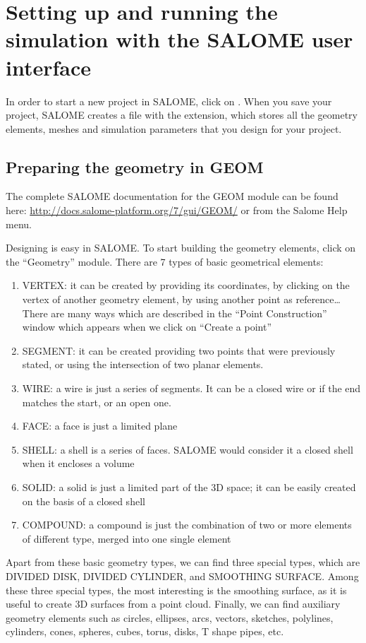 \documentclass{../GPUSPHtemplate}
\begin{document}
\section{Setting up and running the simulation with the SALOME user interface}

In order to start a new project in SALOME, click on . 
When you save your project, SALOME creates a file with the 
 extension, which stores all the geometry elements, 
meshes and simulation parameters that you design for your project.

\subsection{Preparing the geometry in GEOM}

The complete SALOME documentation for the GEOM module can be found here:
\url{http://docs.salome-platform.org/7/gui/GEOM/}
or from the Salome Help menu.

Designing is easy in SALOME. To start building the geometry 
elements, click on the “Geometry” module. 
There are 7 types of basic geometrical elements:
\begin{enumerate}
\item VERTEX: it can be created by providing its coordinates, 
by clicking on the vertex of another geometry element, 
by using another point as reference…There are many ways 
which are described in the “Point Construction” window 
which appears when we click on “Create a point”
\item SEGMENT: it can be created providing two points 
that were previously stated, or using the intersection of 
two planar elements. 
\item WIRE: a wire is just a series of segments. 
It can be a closed wire or if the end matches the start, 
or an open one.
\item FACE: a face is just a limited plane 
\item SHELL: a shell is a series of faces. 
SALOME would consider it a closed shell when it 
encloses a volume
\item SOLID: a solid is just a limited part of the 3D space; 
it can be easily created on the basis of a closed shell
\item COMPOUND: a compound is just the combination 
of two or more elements of different type, merged 
into one single element
\end{enumerate}
Apart from these basic geometry types, we can find 
three special types, which are 
DIVIDED DISK, DIVIDED CYLINDER, and SMOOTHING SURFACE. 
Among these three special types, the most interesting 
is the smoothing surface, as it is useful to create 
3D surfaces from a point cloud.
Finally, we can find auxiliary geometry elements such as 
circles, ellipses, arcs, vectors, sketches, polylines, cylinders, 
cones, spheres, cubes, torus, disks, T shape pipes, etc.
\end{document}
